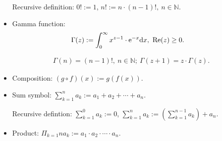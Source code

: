 \documentclass[../../note.tex]{subfiles}
\begin{document}
\begin{itemize}
    Recursive definition: $0!:= 1$, $n!:= n \cdot (n-1)!,~ n \in \mathbb{N}$.
    \item  Gamma function:
    \begin{align}
        \Gamma(z)
        &:= \int_{0}^{\infty} x^{z-1} \cdot {\rm e}^{-x} {\rm d} x,~ {{\rm Re}(z)\geq 0}. 
    \end{align}
    \begin{property}
        \begin{align}
            \Gamma(n) = (n-1)!,~ n \in \mathbb{N}; ~ \Gamma(z+1) = z \cdot \Gamma(z).
        \end{align}
    \end{property}
    \item Composition: $(g \circ f)(x):= g(f(x))$.
    \item Sum symbol: $\sum_{k=1}^n a_k:= a_1 + a_2+ \cdots + a_n$.
    
    Recursive defintion: $\sum_{k=1}^0 a_k:= 0$, $\sum_{k=1}^n a_k := \left(\sum_{k=1}^{n-1} a_k \right) + a_n $.
    \item Product: $\Pi_{k=1}{n} a_k:= a_1 \cdot a_2 \cdot \cdots \cdot a_n$.
    

\end{itemize}
\end{document}
